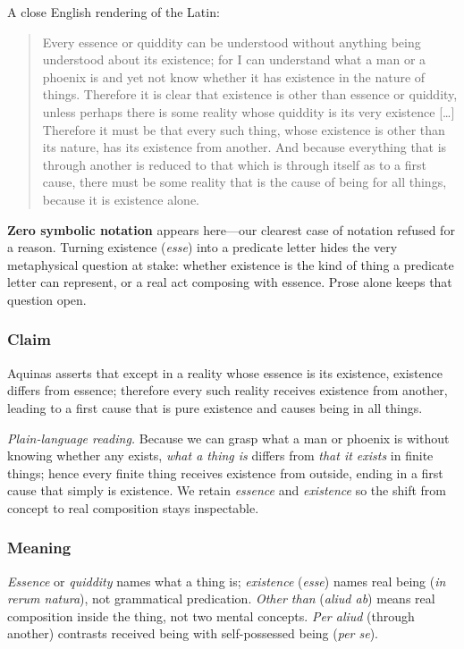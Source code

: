 A close English rendering of the Latin:

\begin{quote}
Every essence or quiddity can be understood without anything being understood about its existence; for I can understand what a man or a phoenix is and yet not know whether it has existence in the nature of things. Therefore it is clear that existence is other than essence or quiddity, unless perhaps there is some reality whose quiddity is its very existence [\dots] Therefore it must be that every such thing, whose existence is other than its nature, has its existence from another. And because everything that is through another is reduced to that which is through itself as to a first cause, there must be some reality that is the cause of being for all things, because it is existence alone.
\end{quote}

\textbf{Zero symbolic notation} appears here---our clearest case of notation refused for a reason. Turning existence (\emph{esse}) into a predicate letter hides the very metaphysical question at stake: whether existence is the kind of thing a predicate letter can represent, or a real act composing with essence. Prose alone keeps that question open.

\subsubsection*{Claim}

Aquinas asserts that except in a reality whose essence is its existence, existence differs from essence; therefore every such reality receives existence from another, leading to a first cause that is pure existence and causes being in all things.

\emph{Plain-language reading.} Because we can grasp what a man or phoenix is without knowing whether any exists, \emph{what a thing is} differs from \emph{that it exists} in finite things; hence every finite thing receives existence from outside, ending in a first cause that simply is existence. We retain \emph{essence} and \emph{existence} so the shift from concept to real composition stays inspectable.

\subsubsection*{Meaning}

\emph{Essence} or \emph{quiddity} names what a thing is; \emph{existence} (\emph{esse}) names real being (\emph{in rerum natura}), not grammatical predication. \emph{Other than} (\emph{aliud ab}) means real composition inside the thing, not two mental concepts. \emph{Per aliud} (through another) contrasts received being with self-possessed being (\emph{per se}).


